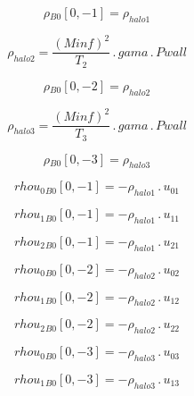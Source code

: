\documentclass{article}
\begin{document}
\begin{dmath}{\rho{_{B0}}}[{0,-1}] = \rho_{halo 1}\end{dmath}

\begin{dmath}\rho_{halo 2} = \frac{\left(Minf \right)^{2}}{T_{2}} \,.\, gama \,.\, Pwall\end{dmath}

\begin{dmath}{\rho{_{B0}}}[{0,-2}] = \rho_{halo 2}\end{dmath}

\begin{dmath}\rho_{halo 3} = \frac{\left(Minf \right)^{2}}{T_{3}} \,.\, gama \,.\, Pwall\end{dmath}

\begin{dmath}{\rho{_{B0}}}[{0,-3}] = \rho_{halo 3}\end{dmath}

\begin{dmath}{rhou_{0}{_{B0}}}[{0,-1}] = - \rho_{halo 1} \,.\, u_{01}\end{dmath}

\begin{dmath}{rhou_{1}{_{B0}}}[{0,-1}] = - \rho_{halo 1} \,.\, u_{11}\end{dmath}

\begin{dmath}{rhou_{2}{_{B0}}}[{0,-1}] = - \rho_{halo 1} \,.\, u_{21}\end{dmath}

\begin{dmath}{rhou_{0}{_{B0}}}[{0,-2}] = - \rho_{halo 2} \,.\, u_{02}\end{dmath}

\begin{dmath}{rhou_{1}{_{B0}}}[{0,-2}] = - \rho_{halo 2} \,.\, u_{12}\end{dmath}

\begin{dmath}{rhou_{2}{_{B0}}}[{0,-2}] = - \rho_{halo 2} \,.\, u_{22}\end{dmath}

\begin{dmath}{rhou_{0}{_{B0}}}[{0,-3}] = - \rho_{halo 3} \,.\, u_{03}\end{dmath}

\begin{dmath}{rhou_{1}{_{B0}}}[{0,-3}] = - \rho_{halo 3} \,.\, u_{13}\end{dmath}
\end{document}
